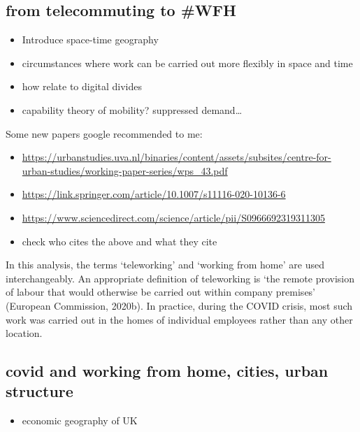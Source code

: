 \documentclass[]{interact}
\theoremstyle{plain}%
\theoremstyle{definition}
\theoremstyle{remark}
\def\tightlist{}
\begin{document}
\hypertarget{from-telecommuting-to-wfh}{%
\subsection{from telecommuting to
\#WFH}\label{from-telecommuting-to-wfh}}

\begin{itemize}
\tightlist
\item
  Introduce space-time geography
\item
  circumstances where work can be carried out more flexibly in space and
  time
\item
  how relate to digital divides
\item
  capability theory of mobility? suppressed demand\ldots{}
\end{itemize}

Some new papers google recommended to me:

\begin{itemize}
\tightlist
\item
  \url{https://urbanstudies.uva.nl/binaries/content/assets/subsites/centre-for-urban-studies/working-paper-series/wps_43.pdf}
\item
  \url{https://link.springer.com/article/10.1007/s11116-020-10136-6}
\item
  \url{https://www.sciencedirect.com/science/article/pii/S0966692319311305}
\item
  check who cites the above and what they cite
\end{itemize}

In this analysis, the terms `teleworking' and `working from home' are
used interchangeably. An appropriate definition of teleworking is `the
remote provision of labour that would otherwise be carried out within
company premises' (European Commission, 2020b). In practice, during the
COVID crisis, most such work was carried out in the homes of individual
employees rather than any other location. \citep{eurofound2020}

\hypertarget{covid-and-working-from-home-cities-urban-structure}{%
\subsection{covid and working from home, cities, urban
structure}\label{covid-and-working-from-home-cities-urban-structure}}

\begin{itemize}
\tightlist
\item
  economic geography of UK
\end{itemize}
\end{document}
